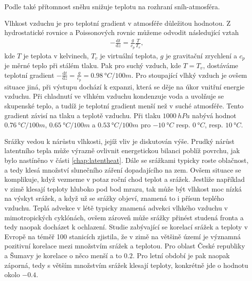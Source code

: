 Podle \cite{zhangwei2021} také přítomnost sněhu snižuje teplotu na rozhraní sníh-atmosféra.

Vlhkost vzduchu je pro teplotní gradient v atmosféře důležitou hodnotou. Z hydrostatické rovnice a Poissonových rovnic můžeme odvodit následující vztah\cite{jakvznikapocasi}
\begin{gather*}
-\frac{\text{d}t}{\text{d}z} = \frac{g}{c_p}\frac{T}{T_v},
\end{gather*}
kde $T$ je teplota v kelvinech, $T_v$ je virtuální teplota, $g$ je gravitační zrychlení a $c_p$ je měrné teplo při stálém tlaku. Pak pro suchý vzduch, kde $T=T_v$, dostáváme teplotní gradient $-\frac{\text{d}t}{\text{d}z} = \frac{g}{c_p} = \SI{0.98}{\degree C/100 m}$. Pro stoupající vlhký vzduch je ovšem situace jiná, při výstupu dochází k expanzi, která se děje na úkor vnitřní energie vzduchu. Při chladnutí ve vlhkém vzduchu kondenzuje voda a uvolňuje se skupenské teplo, a tudíž je teplotní gradient menší než v suché atmosféře. Tento gradient závisí na tlaku a teplotě vzduchu. Při tlaku $\SI{1000}{hPa}$ nabývá hodnot $\SI{0.76}{\degree C/100 m}$, $\SI{0.65}{\degree C/100 m}$ a $\SI{0.53}{\degree C/100 m}$ pro $\SI{-10}{\degree C}$ resp. $\SI{0}{\degree C}$, resp. $\SI{10}{\degree C}$\cite{jakvznikapocasi}.

Srážky vedou k nárůstu vlhkosti, jejíž vliv je diskutován výše. Prudký nárůst latentního tepla může výrazně ovlivnit energetickou bilanci poblíž povrchu, jak bylo nastíněno v části \ref{chap:latentheat}. Dále se srážkami typicky roste oblačnost, a tedy klesá množství slunečního záření dopadajícího na zem. Ovšem situace se komplikuje, když vezmeme v potaz roční chod teplot a srážek. Jestliže například v zimě klesají teploty hluboko pod bod mrazu, tak může být vlhkost moc nízká na výskyt srážek, a když už se srážky objeví, znamená to i přísun teplého vzduchu. Teplá advekce v létě typicky znamená advekci vlhkého vzduchu v mimotropických cyklónách, ovšem zároveň může srážky přinést studená fronta a tedy naopak docházet k ochlazení. Studie zabývající se korelací srážek a teploty v Evropě na téměř 100 stanicích zjistila, že v zimě na většině území je významná pozitivní korelace mezi množstvím srážek a teplotou. Pro oblast České republiky a Šumavy je korelace o něco menší a to $0.2$. Pro letní období je pak naopak záporná, tedy s větším množstvím srážek klesají teploty, konkrétně jde o hodnotu okolo $-0.4$\cite{maddenroland1978}.

